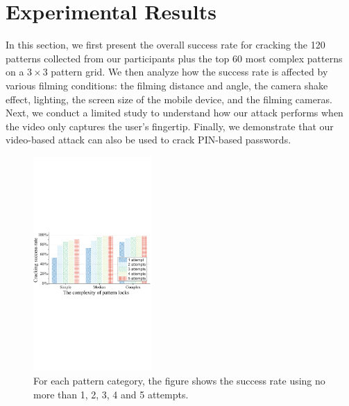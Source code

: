 \section{Experimental Results}
    In this section, we first present the overall success rate for cracking
    the 120 patterns collected from our participants plus the top 60 most complex patterns
    on a $3\times3$ pattern grid.
    We then analyze how the
     success rate is affected by various filming conditions: the filming distance and angle,
    the camera shake effect, lighting, the screen size of the mobile device, and the filming cameras.
    Next, we conduct a limited study to understand how our attack performs when the video only captures the user's fingertip.
     Finally, we demonstrate that our video-based attack can also be used to crack PIN-based passwords.

\begin{figure}[!t]
    \centering
    \includegraphics[width=0.4\textwidth]{fig/10.pdf}
    \vspace{-4mm}
    \caption{For each pattern category, the figure shows the success rate using no more than 1, 2, 3, 4 and 5 attempts.}
    \label{fig:fig10}
    \vspace{-4mm}
\end{figure}

    \vspace{-3mm}
